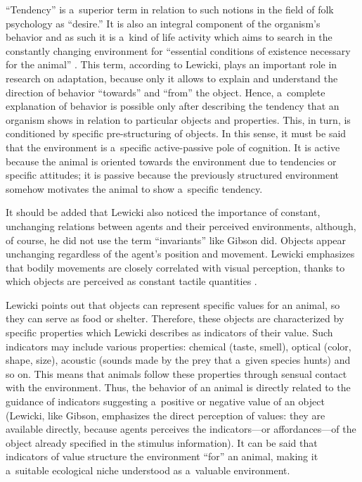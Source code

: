 \documentclass[%
manuscript=article,
year=2024,
volume=77,
doi=10.59203/zfn.77.693,
]{zfn}
\begin{document}
``Tendency'' is a~superior term in relation to such notions in the field of folk psychology as ``desire.'' It is also an integral component of the organism's behavior and as such it is a~kind of life activity which aims to search in the constantly changing environment for ``essential conditions of existence necessary for the animal'' 
\parencite[][pp.168–169]{lewicki_procesy_1960}. %
 This term, according to Lewicki, plays an important role in research on adaptation, because only it allows to explain and understand the direction of behavior ``towards'' and ``from'' the object. Hence, a~complete explanation of behavior is possible only after describing the tendency that an organism shows in relation to particular objects and properties. This, in turn, is conditioned by specific pre-structuring of objects. In this sense, it must be said that the environment is a~specific active-passive pole of cognition. It is active because the animal is oriented towards the environment due to tendencies or specific attitudes; it is passive because the previously structured environment somehow motivates the animal to show a~specific tendency.



It should be added that Lewicki also noticed the importance of constant, unchanging relations between agents and their perceived environments, although, of course, he did not use the term ``invariants'' like Gibson did. Objects appear unchanging regardless of the agent's position and movement. Lewicki emphasizes that bodily movements are closely correlated with visual perception, thanks to which objects are perceived as constant tactile quantities 
\parencite[][p.139]{lewicki_procesy_1960}.%




Lewicki points out that objects can represent specific values for an animal, so they can serve as food or shelter. Therefore, these objects are characterized by specific properties which Lewicki describes as indicators of their value. Such indicators may include various properties: chemical (taste, smell), optical (color, shape, size), acoustic (sounds made by the prey that a~given species hunts) and so on. This means that animals follow these properties through sensual contact with the environment. Thus, the behavior of an animal is directly related to the guidance of indicators suggesting a~positive or negative value of an object (Lewicki, like Gibson, emphasizes the direct perception of values: they are available directly, because agents perceives the indicators---or affordances---of the object already specified in the stimulus information). It can be said that indicators of value structure the environment ``for'' an animal, making it a~suitable ecological niche understood as a~valuable environment.
\end{document}
